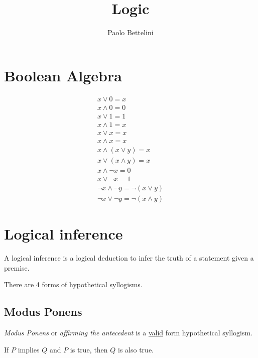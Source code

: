 \documentclass{article}
\title{Logic}
\author{Paolo Bettelini}
\date{}
\begin{document}
\maketitle
\tableofcontents
\pagebreak

\section{Boolean Algebra}


\begin{align*}
    x \lor 0 = x \\
    x \land 0 = 0 \\
    x \lor 1 = 1 \\
    x \land 1 = x \\
    x \lor x = x \\
    x \land x = x \\
    x \land (x \lor y) = x \\
    x \lor (x \land y) = x \\
    x \land \lnot x = 0 \\
    x \lor \lnot x = 1 \\
    \lnot x \land \lnot y = \lnot (x \lor y) \\
    \lnot x \lor \lnot y = \lnot (x \land y)
\end{align*}

\pagebreak

\section{Logical inference}

A logical inference is a logical deduction to infer the truth
of a statement given a premise.

There are 4 forms of hypothetical syllogisms.

\subsection{Modus Ponens}

\textit{Modus Ponens} or \textit{affirming the antecedent}
is a \underline{valid} form hypothetical syllogism.

\begin{prooftree}
\end{prooftree}
If \(P\) implies \(Q\) and \(P\) is true, then \(Q\) is also true.
\end{document}
